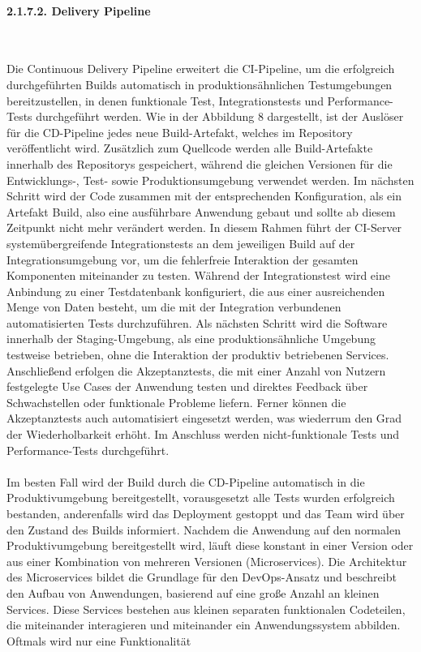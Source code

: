 \paragraph{2.1.7.2. Delivery Pipeline} $~$

Die Continuous Delivery Pipeline erweitert die CI-Pipeline, um die erfolgreich durchgeführten Builds automatisch in produktionsähnlichen Testumgebungen bereitzustellen, in denen funktionale Test, Integrationstests und Performance-Tests durchgeführt werden. \cite[S. 17]{sharma_devops_2017} Wie in der Abbildung 8 dargestellt, ist der Auslöser für die CD-Pipeline jedes neue Build-Artefakt, welches im Repository veröffentlicht wird. Zusätzlich zum Quellcode werden alle Build-Artefakte innerhalb des Repositorys gespeichert, während die gleichen Versionen für die Entwicklungs-, Test- sowie Produktionsumgebung verwendet werden. \cite[S. 109 - 110]{kim_devops-handbuch_2017} Im nächsten Schritt wird der Code zusammen mit der entsprechenden Konfiguration, als ein Artefakt Build, also eine ausführbare Anwendung gebaut und sollte ab diesem Zeitpunkt nicht mehr verändert werden. In diesem Rahmen führt der CI-Server systemübergreifende Integrationstests an dem jeweiligen Build auf der Integrationsumgebung vor, um die fehlerfreie Interaktion der gesamten Komponenten miteinander zu testen. \cite[S. 122]{kim_devops-handbuch_2017} Während der Integrationstest wird eine Anbindung zu einer Testdatenbank konfiguriert, die aus einer ausreichenden Menge von Daten besteht, um die mit der Integration verbundenen automatisierten Tests durchzuführen. \cite[S. 100 - 101]{bass_devops_2015} Als nächsten Schritt wird die Software innerhalb der Staging-Umgebung, als eine produktionsähnliche Umgebung testweise betrieben, ohne die Interaktion der produktiv betriebenen Services. \cite[S. 100 - 101]{bass_devops_2015} Anschließend erfolgen die Akzeptanztests, die mit einer Anzahl von Nutzern festgelegte Use Cases der Anwendung testen und direktes Feedback über Schwachstellen oder funktionale Probleme liefern. \cite[S. 16 - 18]{sharma_devops_2017} Ferner können die Akzeptanztests auch automatisiert eingesetzt werden, was wiederrum den Grad der Wiederholbarkeit erhöht. Im Anschluss werden nicht-funktionale Tests und Performance-Tests durchgeführt.\\\\ Im besten Fall wird der Build durch die CD-Pipeline automatisch in die Produktivumgebung bereitgestellt, vorausgesetzt alle Tests wurden erfolgreich bestanden, anderenfalls wird das Deployment gestoppt und das Team wird über den Zustand des Builds informiert. \cite[S. 64]{forsgren_mindset_2019} Nachdem die Anwendung auf den normalen Produktivumgebung bereitgestellt wird, läuft diese konstant in einer Version oder aus einer Kombination von mehreren Versionen (Microservices). \cite[S. 86]{kim_devops-handbuch_2017} Die Architektur des Microservices bildet die Grundlage für den DevOps-Ansatz und beschreibt den Aufbau von Anwendungen, basierend auf eine große Anzahl an kleinen Services. \cite{sollner_devops_2017} Diese Services bestehen aus kleinen separaten funktionalen Codeteilen, die miteinander interagieren und miteinander ein Anwendungssystem abbilden. Oftmals wird nur eine Funktionalität 